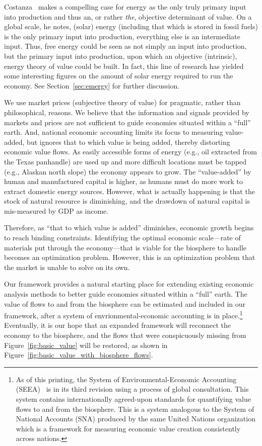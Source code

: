 Costanza~\cite{Costanza:2004we} makes a compelling case for energy 
as the only truly primary input into production 
and thus an, or rather \emph{the}, objective determinant of value. 
On a global scale, he notes, (solar) energy 
(including that which is stored in fossil fuels) is the only primary input into production, 
everything else is an intermediate input. 
Thus, free energy could be seen as not simply an input into production, 
but the primary input into production, upon which an objective (intrinsic), 
energy theory of value could be built. 
In fact, this line of research has yielded some interesting figures on the amount 
of solar energy required to run the economy. 
See Section~\ref{sec:emergy} for further discussion.

We use market prices (subjective theory of value) for pragmatic, 
rather than philosophical, reasons.
We believe that the information and signals provided by markets and prices 
are not sufficient to guide economies situated within a ``full'' earth.
And, national economic accounting limits its focus to measuring value-added, 
but ignores that to which value is being added,
thereby distorting economic value flows. 
As easily accessible forms of energy (e.g.,  oil extracted from the Texas panhandle) 
are used up and more difficult locations must be tapped (e.g., Alaskan north slope) 
the economy appears to grow.
The ``value-added'' by human and manufactured capital is higher, 
as humans must do more work to extract domestic energy sources. 
However, what is actually happening is that the stock 
of natural resource is diminishing, 
and the drawdown of natural capital is mis-measured by GDP as income.\cite[pp.~66~and~75]{Daly1997}

Therefore, as ``that to which value is added'' diminishes, 
economic growth begins to reach binding constraints. 
Identifying the optimal economic 
scale---rate of materials put through the economy---that 
is viable for the biosphere to handle becomes an optimization problem. 
However, this is an optimization 
problem that the market is unable to solve on its own. 

Our framework provides a natural starting place for extending 
existing economic analysis methods to better
guide economies situated within a ``full'' earth. 
The value of flows to and from the biosphere 
can be estimated and included in our framework, 
after a system of envrionmental-economic accounting is in place.\footnote{As of this printing, 
	the System of Environmental-Economic Accounting (SEEA)~\cite{UNSEEA:aa}
	is in its third revision 
	using a process of global consultation. 
	This system contains internationally agreed-upon standards for quantifying value flows 
	to and from the biosphere. 
	This is a system analogous to the System of National Accounts (SNA) 
	produced by the same United Nations organization
	which is a framework for measuring economic value creation consistently across nations.} 
Eventually, it is our hope that
an expanded framework will reconnect the economy to the biosphere, 
and the flows that were conspicuously 
missing from Figure~\ref{fig:basic_value} will
be restored, as shown in Figure~\ref{fig:basic_value_with_biosphere_flows}.

